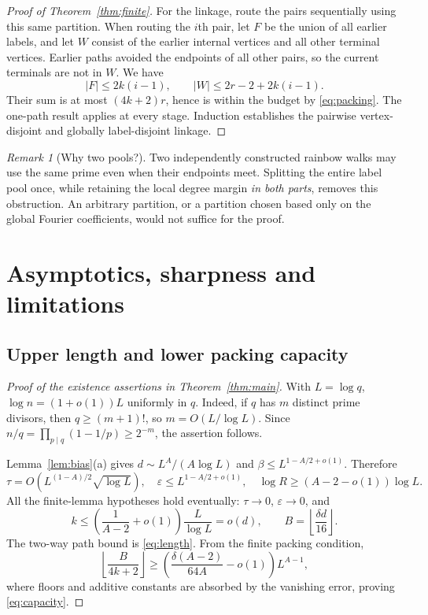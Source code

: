 \documentclass[11pt]{article}
\theoremstyle{remark}\newtheorem{remark}[theorem]{Remark}
\newcommand{\abs}[1]{\lvert#1\rvert}
\newcommand{\ee}{\varepsilon}
\begin{document}
\begin{proof}[Proof of Theorem~\ref{thm:finite}]
For the linkage, route the pairs sequentially using this same partition. When routing the $i$th pair, let $F$ be the union of all earlier labels, and let $W$ consist of the earlier internal vertices and all other terminal vertices. Earlier paths avoided the endpoints of all other pairs, so the current terminals are not in $W$. We have
\[
 \abs F\le2k(i-1),\qquad
 \abs W\le2r-2+2k(i-1).
\]
Their sum is at most $(4k+2)r$, hence is within the budget by \eqref{eq:packing}. The one-path result applies at every stage. Induction establishes the pairwise vertex-disjoint and globally label-disjoint linkage.
\end{proof}

\begin{remark}[Why two pools?]
Two independently constructed rainbow walks may use the same prime even when their endpoints meet. Splitting the entire label pool once, while retaining the local degree margin \emph{in both parts}, removes this obstruction. An arbitrary partition, or a partition chosen based only on the global Fourier coefficients, would not suffice for the proof.
\end{remark}

\section{Asymptotics, sharpness and limitations}
\subsection{Upper length and lower packing capacity}
\begin{proof}[Proof of the existence assertions in Theorem~\ref{thm:main}]
With $L=\log q$, $\log n=(1+o(1))L$ uniformly in $q$. Indeed, if $q$ has $m$ distinct prime divisors, then $q\ge(m+1)!$, so $m=O(L/\log L)$. Since $n/q=\prod_{p\mid q}(1-1/p)\ge2^{-m}$, the assertion follows.

Lemma~\ref{lem:bias}(a) gives $d\sim L^A/(A\log L)$ and $\beta\le L^{1-A/2+o(1)}$. Therefore
\[
 \tau=O\left(L^{(1-A)/2}\sqrt{\log L}\right),\quad
 \ee\le L^{1-A/2+o(1)},\quad
 \log R\ge (A-2-o(1))\log L.
\]
All the finite-lemma hypotheses hold eventually: $\tau\to0$, $\ee\to0$, and
\[
 k\le\left(\frac{1}{A-2}+o(1)\right)\frac{L}{\log L}=o(d),
 \qquad B=\left\lfloor\frac{\delta d}{16}\right\rfloor.
\]
The two-way path bound is \eqref{eq:length}. From the finite packing condition,
\[
 \left\lfloor\frac{B}{4k+2}\right\rfloor
 \ge\left(\frac{\delta(A-2)}{64A}-o(1)\right)L^{A-1},
\]
where floors and additive constants are absorbed by the vanishing error, proving \eqref{eq:capacity}.
\end{proof}
\end{document}
